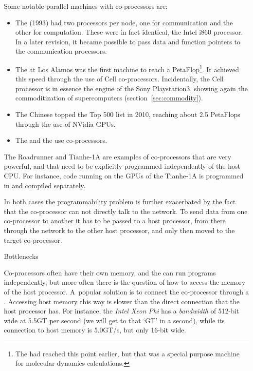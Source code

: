Some notable parallel machines with co-processors are:
\begin{itemize}
\item The  (1993) had two processors per
  node, one for communication and the other for computation. These
  were in fact identical, the Intel i860
  processor. In a later revision, it became possible to pass data and
  function pointers to the communication processors.
\item The  at Los Alamos was the first
  machine to reach a PetaFlop\footnote{The 
    had reached this point earlier, but that was a special purpose
    machine for molecular dynamics calculations.}. It achieved this
  speed through the use of Cell
  co-processors. Incidentally, the Cell processor is in essence the
  engine of the Sony Playstation3, showing again the commoditization
  of supercomputers (section~\ref{sec:commodity}).
\item The Chinese  topped the Top 500 list in
  2010, reaching about 2.5 PetaFlops through the use of
  NVidia \acp{GPU}.
\item The  and the 
  use  co-processors.
\end{itemize}
The Roadrunner and Tianhe-1A are examples of co-processors that are
very powerful, and that need to be explicitly programmed independently
of the host CPU. For instance, code running on the \acp{GPU} of the
Tianhe-1A is programmed in  and compiled separately.

In both cases the programmability problem is further exacerbated by
the fact that the co-processor can not directly talk to the network.
To send data from one co-processor to another it has to be passed to a
host processor, from there through the network to the other host
processor, and only then moved to the target co-processor.


 {Bottlenecks}

Co-processors often have their own memory, and the
 can run programs independently, but
more often there is the question of how to access the memory of the
host processor. A~popular solution is to connect the co-processor
through a . Accessing host memory this way is
slower than the direct connection that the host processor has. For
instance, the \emph{Intel Xeon Phi} has a
\emph{bandwidth} of 512-bit wide at
5.5GT per second (we will get to that `GT' in a second), while its
connection to host memory is 5.0GT/s, but only 16-bit wide.

